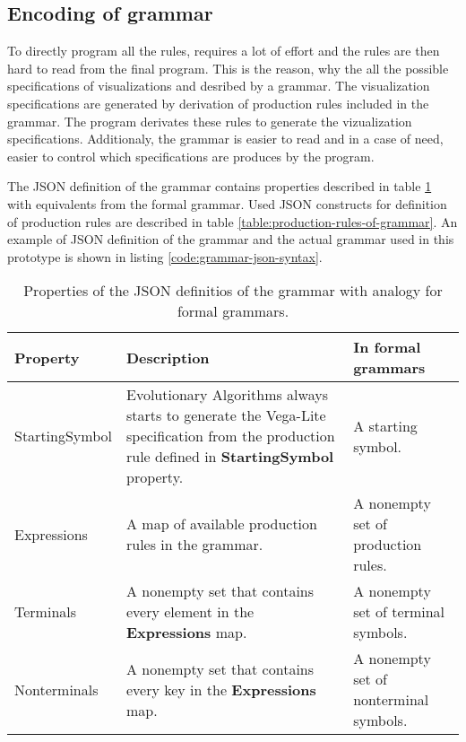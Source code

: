 \subsection{Encoding of grammar}
To directly program all the rules, requires a lot of effort and the rules are then hard to read from the final program. This is the reason, why the all the possible specifications of visualizations and desribed by a grammar. The visualization specifications are generated by derivation of production rules included in the grammar. The program derivates these rules to generate the vizualization specifications. Additionaly, the grammar is easier to read and in a case of need, easier to control which specifications are produces by the program.

The JSON definition of the grammar contains properties described in table \ref{table:properties-of-grammar} with equivalents from the formal grammar. Used JSON constructs for definition of production rules are described in table \ref{table:production-rules-of-grammar}.
An example of JSON definition of the grammar and the actual grammar used in this prototype is shown in listing \ref{code:grammar-json-syntax}.
\begin{table}[htbp]
  \centering
  \caption{Properties of the JSON definitios of the grammar with analogy for formal grammars.}
  \label{table:properties-of-grammar}
      \begin{tabular}{ m{6em} m{13em} m{10em} }
      \hline
          \textbf{Property} & \textbf{Description} & \textbf{In formal grammars} \\
      \toprule
\hline StartingSymbol & Evolutionary Algorithms always starts to generate the Vega-Lite specification from the production rule defined in \textbf{StartingSymbol} property. & A starting symbol. \\
\hline Expressions & A map of available production rules in the grammar. & A nonempty set of production rules. \\
\hline Terminals & A nonempty set that contains every element in the \textbf{Expressions} map. & A nonempty set of terminal symbols. \\
\hline Nonterminals & A nonempty set that contains every key in the \textbf{Expressions} map. & A nonempty set of nonterminal symbols. \\
\hline
    \end{tabular}
\end{table}

